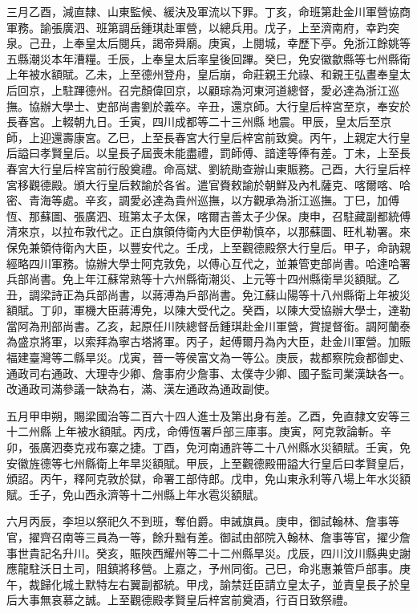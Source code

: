 \begin{pinyinscope}
三月乙酉，減直隸、山東監候、緩決及軍流以下罪。丁亥，命班第赴金川軍營協商軍務。諭張廣泗、班第調岳鍾琪赴軍營，以總兵用。戊子，上至濟南府，幸趵突泉。己丑，上奉皇太后閱兵，謁帝舜廟。庚寅，上閱城，幸歷下亭。免浙江餘姚等五縣潮災本年漕糧。壬辰，上奉皇太后率皇後回蹕。癸巳，免安徽歙縣等七州縣衛上年被水額賦。乙未，上至德州登舟，皇后崩，命莊親王允祿、和親王弘晝奉皇太后回京，上駐蹕德州。召完顏偉回京，以顧琮為河東河道總督，愛必達為浙江巡撫。協辦大學士、吏部尚書劉於義卒。辛丑，還京師。大行皇后梓宮至京，奉安於長春宮。上輟朝九日。壬寅，四川成都等二十三州縣地震。甲辰，皇太后至京師，上迎還壽康宮。乙巳，上至長春宮大行皇后梓宮前致奠。丙午，上親定大行皇后謚曰孝賢皇后。以皇長子屆喪未能盡禮，罰師傅、諳達等俸有差。丁未，上至長春宮大行皇后梓宮前行殷奠禮。命高斌、劉統勛查辦山東賑務。己酉，大行皇后梓宮移觀德殿。頒大行皇后敕諭於各省。遣官賚敕諭於朝鮮及內札薩克、喀爾喀、哈密、青海等處。辛亥，調愛必達為貴州巡撫，以方觀承為浙江巡撫。丁巳，加傅恆、那蘇圖、張廣泗、班第太子太保，喀爾吉善太子少保。庚申，召駐藏副都統傅清來京，以拉布敦代之。正白旗領侍衛內大臣伊勒慎卒，以那蘇圖、旺札勒署。來保免兼領侍衛內大臣，以豐安代之。壬戌，上至觀德殿祭大行皇后。甲子，命訥親經略四川軍務。協辦大學士阿克敦免，以傅心互代之，並兼管吏部尚書。哈達哈署兵部尚書。免上年江蘇常熟等十六州縣衛潮災、上元等十四州縣衛旱災額賦。乙丑，調梁詩正為兵部尚書，以蔣溥為戶部尚書。免江蘇山陽等十八州縣衛上年被災額賦。丁卯，軍機大臣蔣溥免，以陳大受代之。癸酉，以陳大受協辦大學士，達勒當阿為刑部尚書。乙亥，起原任川陜總督岳鍾琪赴金川軍營，賞提督銜。調阿蘭泰為盛京將軍，以索拜為寧古塔將軍。丙子，起傅爾丹為內大臣，赴金川軍營。加賑福建臺灣等二縣旱災。戊寅，晉一等侯富文為一等公。庚辰，裁都察院僉都御史、通政司右通政、大理寺少卿、詹事府少詹事、太僕寺少卿、國子監司業漢缺各一。改通政司滿參議一缺為右，滿、漢左通政為通政副使。

五月甲申朔，賜梁國治等二百六十四人進士及第出身有差。乙酉，免直隸文安等三十二州縣上年被水額賦。丙戌，命傅恆署戶部三庫事。庚寅，阿克敦論斬。辛卯，張廣泗奏克戎布寨之捷。丁酉，免河南通許等二十八州縣水災額賦。壬寅，免安徽旌德等七州縣衛上年旱災額賦。甲辰，上至觀德殿冊謚大行皇后曰孝賢皇后，頒詔。丙午，釋阿克敦於獄，命署工部侍郎。戊申，免山東永利等八場上年水災額賦。壬子，免山西永濟等十二州縣上年水雹災額賦。

六月丙辰，李坦以祭祀久不到班，奪伯爵。申誡旗員。庚申，御試翰林、詹事等官，擢齊召南等三員為一等，餘升黜有差。御試由部院入翰林、詹事等官，擢少詹事世貴記名升川。癸亥，賑陜西耀州等二十二州縣旱災。戊辰，四川汶川縣典史謝應龍駐沃日土司，阻鎮將移營。上嘉之，予州同銜。己巳，命兆惠兼管戶部事。庚午，裁歸化城土默特左右翼副都統。甲戌，諭禁廷臣請立皇太子，並責皇長子於皇后大事無哀慕之誠。上至觀德殿孝賢皇后梓宮前奠酒，行百日致祭禮。


\end{pinyinscope}
